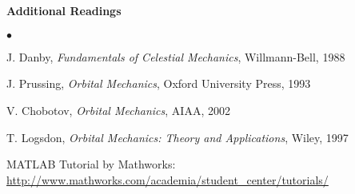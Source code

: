 \documentclass[10pt]{article}
\begin{document}
\paragraph*{Additional Readings}
\begin{list}
{$\bullet$}
{\setlength{\itemsep}{-3pt}}
\item J. Danby, \textit{Fundamentals of Celestial Mechanics}, Willmann-Bell, 1988
\item J. Prussing, \textit{Orbital Mechanics}, Oxford University Press, 1993
\item V. Chobotov, \textit{Orbital Mechanics}, AIAA, 2002
\item T. Logsdon, \textit{Orbital Mechanics: Theory and Applications}, Wiley, 1997
\item MATLAB Tutorial by Mathworks: \url{http://www.mathworks.com/academia/student_center/tutorials/}
\end{list}
\end{document}
